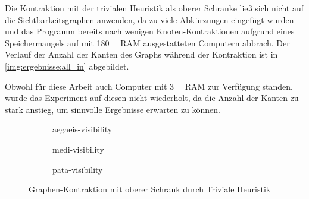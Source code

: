 Die Kontraktion mit der trivialen Heuristik als oberer Schranke ließ sich nicht auf die Sichtbarkeitsgraphen anwenden, da zu viele Abkürzungen eingefügt wurden und das Programm bereits nach wenigen Knoten-Kontraktionen aufgrund eines Speichermangels auf mit \SI{180}{\giga\byte} RAM ausgestatteten Computern abbrach.
Der Verlauf der Anzahl der Kanten des Graphs während der Kontraktion ist in \autoref{img:ergebnisse:all_in} abgebildet.

Obwohl für diese Arbeit auch Computer mit \SI{3}{\tera\byte} RAM  zur Verfügung standen, wurde das Experiment auf diesen nicht wiederholt, da die Anzahl der Kanten zu stark anstieg, um sinnvolle Ergebnisse erwarten zu können.

\begin{figure}[p]%
  \begin{subfigure}[b]{0.5\textwidth}
    \caption{aegaeis-visibility}%
  \end{subfigure}%
  \begin{subfigure}[b]{0.5\textwidth}%
    \caption{medi-visibility}%
  \end{subfigure}%
  \par%
  \begin{subfigure}[b]{0.5\textwidth}%
    \caption{pata-visibility}
  \end{subfigure}
  \caption{Graphen-Kontraktion mit oberer Schrank durch Triviale Heuristik}
  \label{img:ergebnisse:all_in}
\end{figure}


